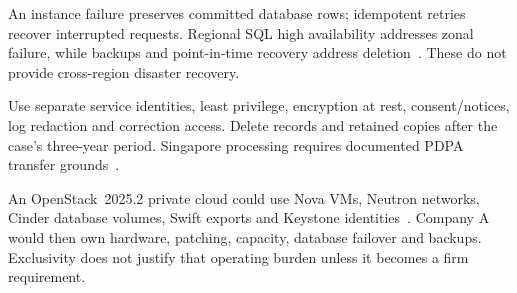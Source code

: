 An instance failure preserves committed database rows; idempotent retries recover interrupted requests. Regional SQL high availability addresses zonal failure, while backups and point-in-time recovery address deletion~\cite{ha}. These do not provide cross-region disaster recovery.

Use separate service identities, least privilege, encryption at rest, consent/notices, log redaction and correction access. Delete records and retained copies after the case's three-year period. Singapore processing requires documented PDPA transfer grounds~\cite{pdpa,transfer}.

An OpenStack~2025.2 private cloud could use Nova VMs, Neutron networks, Cinder database volumes, Swift exports and Keystone identities~\cite{openstack}. Company A would then own hardware, patching, capacity, database failover and backups. Exclusivity does not justify that operating burden unless it becomes a firm requirement.

